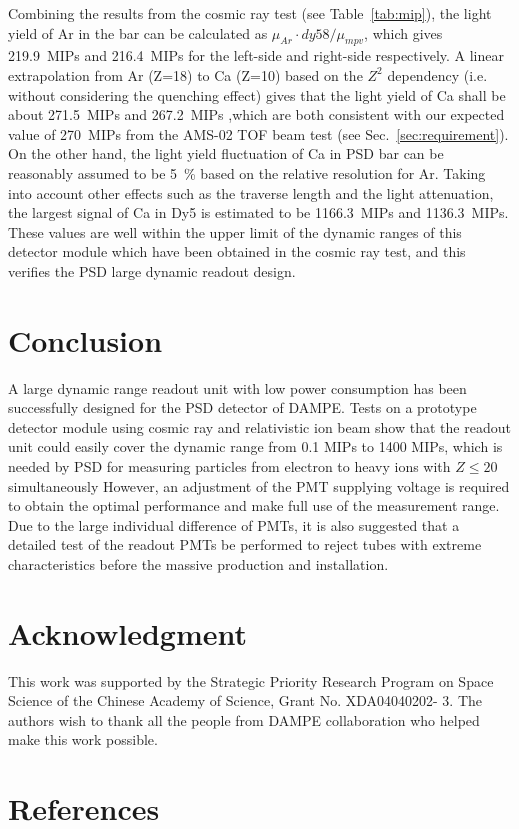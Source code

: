 \documentclass[preprint, times]{elsarticle}
\begin{document}
Combining the results from the cosmic ray test (see Table~\ref{tab:mip}), the light yield of Ar in the bar can be calculated as ${\mu_{Ar}\cdot dy58} / {\mu_{mpv}}$, which gives \SI{219.9}{MIPs} and \SI{216.4}{MIPs} for the left-side and right-side respectively.
A linear extrapolation from Ar (Z=18) to Ca (Z=10) based on the $Z^2$ dependency (i.e. without considering the quenching effect) gives that the light yield of Ca shall be about \SI{271.5}{MIPs} and \SI{267.2}{MIPs} ,which are both consistent with our expected value of \SI{270}{MIPs} from the AMS-02 TOF beam test (see Sec.~\ref{sec:requirement}). 
On the other hand, the light yield fluctuation of Ca in PSD bar can be reasonably assumed to be \SI{5}{\percent} based on the relative resolution for Ar.
Taking into account other effects such as the traverse length and the light attenuation, the largest signal of Ca in Dy5 is estimated to be \SI{1166.3}{MIPs} and \SI{1136.3}{MIPs}.
These values are well within the upper limit of the dynamic ranges of this detector module which have been obtained in the cosmic ray test, and this verifies the PSD large dynamic readout design.


\section{Conclusion}
\label{sec:conclusion}
A large dynamic range readout unit with low power consumption has been successfully designed for the PSD detector of DAMPE.
Tests on a prototype detector module using cosmic ray and relativistic ion beam show that the readout unit could easily cover the dynamic range from 0.1 MIPs to 1400 MIPs, which is needed by PSD for measuring particles from electron to heavy ions with $Z\leq 20$ simultaneously 
However, an adjustment of the PMT supplying voltage is required to obtain the optimal performance and make full use of the measurement range. 
Due to the large individual difference of PMTs, it is also suggested that a detailed test of the readout PMTs be performed to reject tubes with extreme characteristics before the massive production and installation.

\section*{Acknowledgment}
\label{sec:acknowledgement}

This work was supported by the Strategic Priority Research Program on Space Science of the Chinese Academy of Science,
Grant No. XDA04040202- 3.
The authors wish to thank all the people from DAMPE collaboration who helped make this work possible.

\section*{References}
\label{sec:reference}



\end{document}
